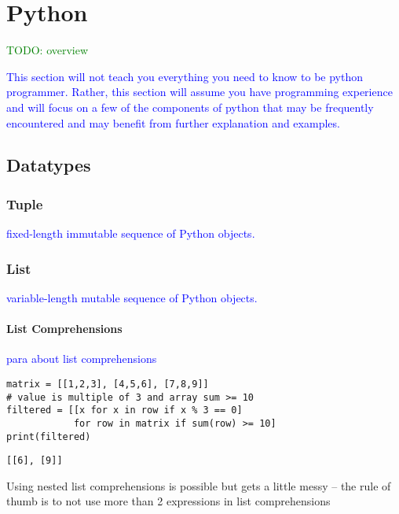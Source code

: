 \section{Python}

\textcolor{green}{TODO: overview}

\textcolor{blue}{This section will not teach you everything you need to know to be python programmer. Rather, this section will assume you have programming experience and will focus on a few of the components of python that may be frequently encountered and may benefit from further explanation and examples.}

\subsection{Datatypes}

\subsubsection{Tuple}

\textcolor{blue}{fixed-length immutable sequence of Python objects.}

\subsubsection{List}

\textcolor{blue}{variable-length mutable sequence of Python objects.}

\paragraph{List Comprehensions}

\textcolor{blue}{para about list comprehensions}

\begin{lstlisting}[style=pyInStyle]
matrix = [[1,2,3], [4,5,6], [7,8,9]]
# value is multiple of 3 and array sum >= 10
filtered = [[x for x in row if x % 3 == 0]
            for row in matrix if sum(row) >= 10]
print(filtered)
\end{lstlisting}
\begin{lstlisting}[style=pyOutStyle]
[[6], [9]]
\end{lstlisting}
\begin{markdown}
Using nested list comprehensions is possible but gets a little messy -- the rule of thumb is to not use more than 2 expressions in list comprehensions
\end{markdown}

